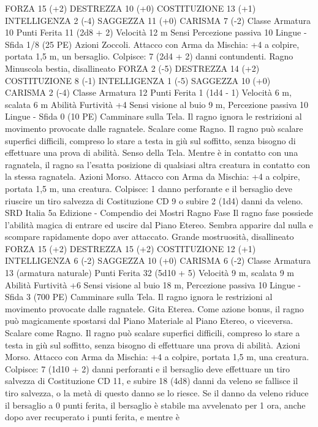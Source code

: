 \begin{multicols}{2}
FORZA 15 (+2)
DESTREZZA 10 (+0)
COSTITUZIONE 13 (+1)
INTELLIGENZA 2 (-4)
SAGGEZZA 11 (+0)
CARISMA 7 (-2)
Classe Armatura 10
Punti Ferita 11 (2d8 + 2)
Velocità 12 m
Sensi Percezione passiva 10
Lingue -
Sfida 1/8 (25 PE)
Azioni
Zoccoli. Attacco con Arma da Mischia: +4 a colpire, portata 1,5
m, un bersaglio.
Colpisce: 7 (2d4 + 2) danni contundenti.
Ragno
Minuscola bestia, disallineato
FORZA 2 (-5)
DESTREZZA 14 (+2)
COSTITUZIONE 8 (-1)
INTELLIGENZA 1 (-5)
SAGGEZZA 10 (+0)
CARISMA 2 (-4)
Classe Armatura 12
Punti Ferita 1 (1d4 - 1)
Velocità 6 m, scalata 6 m
Abilità Furtività +4
Sensi visione al buio 9 m, Percezione passiva 10
Lingue -
Sfida 0 (10 PE)
Camminare sulla Tela. Il ragno ignora le restrizioni al
movimento provocate dalle ragnatele.
Scalare come Ragno. Il ragno può scalare superfici difficili,
compreso lo stare a testa in giù sul soffitto, senza bisogno di
effettuare una prova di abilità.
Senso della Tela. Mentre è in contatto con una ragnatela, il
ragno sa l’esatta posizione di qualsiasi altra creatura in contatto
con la stessa ragnatela.
Azioni
Morso. Attacco con Arma da Mischia: +4 a colpire, portata 1,5
m, una creatura.
Colpisce: 1 danno perforante e il bersaglio deve riuscire un tiro
salvezza di Costituzione CD 9 o subire 2 (1d4) danni da veleno.
SRD Italia 5a Edizione - Compendio dei Mostri
Ragno Fase
Il ragno fase possiede l’abilità magica di entrare ed
uscire dal Piano Etereo. Sembra apparire dal nulla e
scompare rapidamente dopo aver attaccato.
Grande mostruosità, disallineato
FORZA 15 (+2)
DESTREZZA 15 (+2)
COSTITUZIONE 12 (+1)
INTELLIGENZA 6 (-2)
SAGGEZZA 10 (+0)
CARISMA 6 (-2)
Classe Armatura 13 (armatura naturale)
Punti Ferita 32 (5d10 + 5)
Velocità 9 m, scalata 9 m
Abilità Furtività +6
Sensi visione al buio 18 m, Percezione passiva 10
Lingue -
Sfida 3 (700 PE)
Camminare sulla Tela. Il ragno ignora le restrizioni al
movimento provocate dalle ragnatele.
Gita Eterea. Come azione bonus, il ragno può magicamente
spostarsi dal Piano Materiale al Piano Etereo, o viceversa.
Scalare come Ragno. Il ragno può scalare superfici difficili,
compreso lo stare a testa in giù sul soffitto, senza bisogno di
effettuare una prova di abilità.
Azioni
Morso. Attacco con Arma da Mischia: +4 a colpire, portata 1,5
m, una creatura.
Colpisce: 7 (1d10 + 2) danni perforanti e il bersaglio deve
effettuare un tiro salvezza di Costituzione CD 11, e subire 18
(4d8) danni da veleno se fallisce il tiro salvezza, o la metà di
questo danno se lo riesce. Se il danno da veleno riduce il
bersaglio a 0 punti ferita, il bersaglio è stabile ma avvelenato per
1 ora, anche dopo aver recuperato i punti ferita, e mentre è

\end{multicols}
